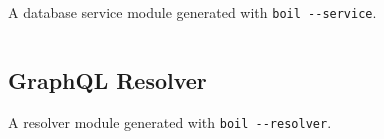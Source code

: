 \documentclass{article}
\begin{document}
A \typeorm{} database service module
generated 
with \texttt{boil -{}-service}.

\inputminted[linenos,stepnumber=5,frame=single,fontsize=\small]{TypeScript}{group-service.ts}

\subsection{GraphQL Resolver}
\label{sec:output-resolver}

A \gql{} resolver module
generated 
with \texttt{boil -{}-resolver}.

\inputminted[linenos,stepnumber=5,frame=single,fontsize=\small]{TypeScript}{group-resolver.ts}
\end{document}
